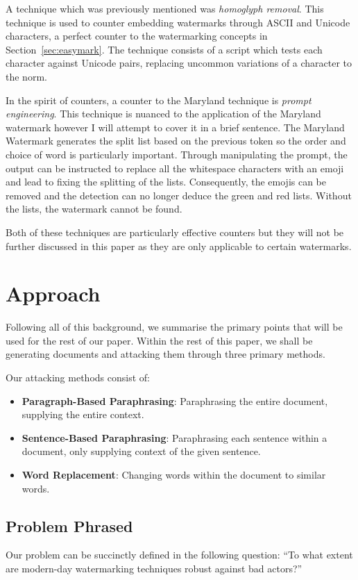 \documentclass{l4proj}
\theoremstyle{definition}
\begin{document}
        A technique which was previously mentioned was \emph{homoglyph removal}. This technique is used to counter embedding watermarks through ASCII and Unicode characters, a perfect counter to the watermarking concepts in Section~\ref{sec:easymark}. The technique consists of a script which tests each character against Unicode pairs, replacing uncommon variations of a character to the norm. 

        In the spirit of counters, a counter to the Maryland technique is \emph{prompt engineering}. This technique is nuanced to the application of the Maryland watermark however I will attempt to cover it in a brief sentence. The Maryland Watermark generates the split list based on the previous token so the order and choice of word is particularly important. Through manipulating the prompt, the output can be instructed to replace all the whitespace characters with an emoji and lead to fixing the splitting of the lists. Consequently, the emojis can be removed and the detection can no longer deduce the green and red lists. Without the lists, the watermark cannot be found. 

        Both of these techniques are particularly effective counters but they will not be further discussed in this paper as they are only applicable to certain watermarks. 

\section{Approach}  
    Following all of this background, we summarise the primary points that will be used for the rest of our paper. Within the rest of this paper, we shall be generating documents and attacking them through three primary methods.

    Our attacking methods consist of:
    \begin{itemize}
        \setlength\itemsep{0.5em}
        \item \textbf{Paragraph-Based Paraphrasing}: Paraphrasing the entire document, supplying the entire context. 
        \item \textbf{Sentence-Based Paraphrasing}: Paraphrasing each sentence within a document, only supplying context of the given sentence.
        \item \textbf{Word Replacement}: Changing words within the document to similar words.
    \end{itemize}
    
    \subsection{Problem Phrased}
        Our problem can be succinctly defined in the following question: ``To what extent are modern-day watermarking techniques robust against bad actors?''
\end{document}
